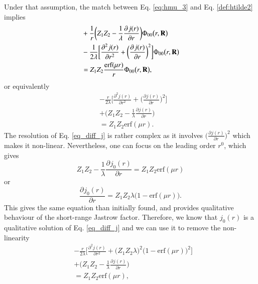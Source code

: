 \documentclass[aip,jcp,reprint,noshowkeys,superscriptaddress]{revtex4-1}
\newcommand{\deriv}[3]{\frac{\partial^{#3} #1}{\partial {#2}^{#3}}}
\newcommand{\bd}[1]{{\bf {#1}}}
\begin{document}
Under that assumption, the match between Eq. \eqref{eq:hmu_3} and Eq. \eqref{def:htilde2} implies 
\begin{equation}
 \begin{aligned}
& + \frac{1}{r} \bigg( Z_1 Z_2 - \frac{1}{\lambda}  \deriv{j(r)}{r}{} \bigg) \Phi_{00}\big(r,\bd{R}\big) \\
& - \frac{1}{2\lambda}\bigg[ \deriv{j(r)}{r}{2} + \bigg(\deriv{j(r)}{r}{}\bigg)^2\bigg]\Phi_{00}\big(r,\bd{R}\big) \\
& = Z_1 Z_2 \frac{\text{erf}(\mu r)}{r}\Phi_{00}\big(r,\bd{R}\big),
 \end{aligned}
\end{equation}
or equivalently
\begin{equation}
 \begin{aligned}
 \label{eq_diff_j}
& - \frac{r}{2\lambda}\bigg[ \deriv{j(r)}{r}{2} + \bigg(\deriv{j(r)}{r}{}\bigg)^2\bigg] \\
& + \bigg( Z_1 Z_2 - \frac{1}{\lambda}  \deriv{j(r)}{r}{} \bigg)  \\
& = Z_1 Z_2 \text{erf}(\mu r).
 \end{aligned}
\end{equation}
The resolution of Eq. \eqref{eq_diff_j} is rather complex as it involves $\bigg(\deriv{j(r)}{r}{}\bigg)^2$ which makes it non-linear. 
Nevertheless, one can focus on the leading order $r^0$, which gives
\begin{equation}
 Z_1 Z_2 - \frac{1}{\lambda}  \deriv{j_0(r)}{r}{} = Z_1 Z_2 \text{erf}(\mu r)
\end{equation}
or 
\begin{equation}
 \label{eq_diff_j0}
   \deriv{j_0(r)}{r}{} = Z_1 Z_2 \lambda \big( 1 - \text{erf}(\mu r)\big). 
\end{equation}
This gives the same equation than initially found, and provides qualitative behaviour of the short-range Jastrow factor. 
Therefore, we know that $j_0(r)$ is a qualitative solution of Eq. \eqref{eq_diff_j} and we can use it to remove the non-linearity
\begin{equation}
 \begin{aligned}
 \label{eq_diff_j1}
& - \frac{r}{2\lambda}\bigg[ \deriv{j(r)}{r}{2} + \big( Z_1 Z_2 \lambda\big)^2 \big( 1 - \text{erf}(\mu r)\big)^2\bigg] \\
& + \bigg( Z_1 Z_2 - \frac{1}{\lambda}  \deriv{j(r)}{r}{} \bigg)  \\
& = Z_1 Z_2 \text{erf}(\mu r),
 \end{aligned}
\end{equation}
\end{document}
